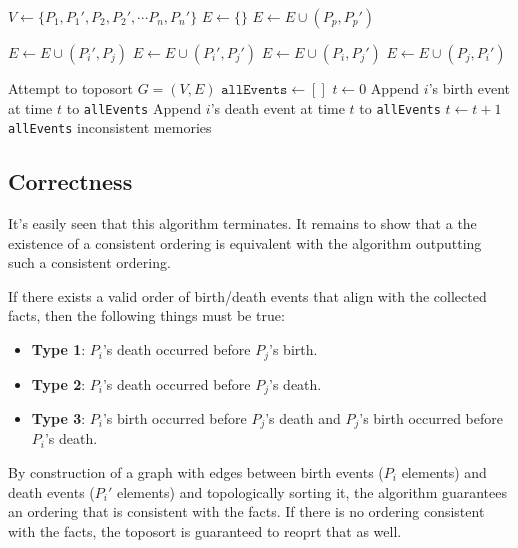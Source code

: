 \documentclass[12pt]{article}
\begin{document}
\begin{algorithmic}[1]
    \State $V \gets \{P_1, P_1', P_2, P_2', \cdots P_n, P_n'\}$
    \State $E \gets \{\}$
        \State $E \gets E \cup (P_p, P_p')$
    \EndFor

    \item[]
            \State $E \gets E \cup (P_i', P_j)$
            \State $E \gets E \cup (P_i', P_j')$
            \State $E \gets E \cup (P_i, P_j')$
            \State $E \gets E \cup (P_j, P_i')$
        \EndIf
    \EndFor

    \item[]
    \State Attempt to toposort $G = (V, E)$
        \State $\texttt{allEvents} \gets []$
        \State $t \gets 0$
                \State Append $i$'s birth event at time $t$ to \texttt{allEvents}
                \State Append $i$'s death event at time $t$ to \texttt{allEvents}
            \EndIf
            \State $t \gets t + 1$
        \EndFor
        \State \Return \texttt{allEvents}
    \Else
        \State \Return inconsistent memories
    \EndIf
\end{algorithmic}

\pagebreak

\subsection{Correctness}

It's easily seen that this algorithm terminates.
It remains to show that a the existence of a consistent ordering
is equivalent with the algorithm outputting such a consistent ordering.

If there exists a valid order of birth/death events that align
with the collected facts, then the following things must be true:
\begin{itemize}[nolistsep]
    \item \textbf{Type 1}: $P_i$'s death occurred before $P_j$'s birth.
    \item \textbf{Type 2}: $P_i$'s death occurred before $P_j$'s death.
    \item \textbf{Type 3}: $P_i$'s birth occurred before $P_j$'s death
          and $P_j$'s birth occurred before $P_i$'s death.
\end{itemize}
By construction of a graph with edges between birth events ($P_i$ elements)
and death events ($P_i'$ elements) and topologically sorting it,
the algorithm guarantees an ordering that is consistent with the facts.
If there is no ordering consistent with the facts, the toposort
is guaranteed to reoprt that as well.
\end{document}

